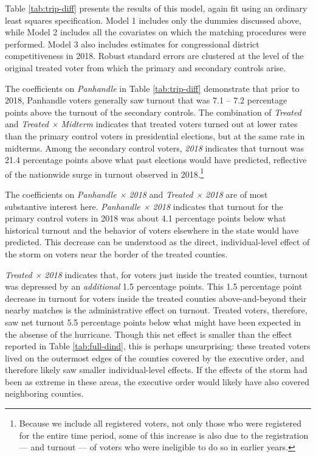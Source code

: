 \documentclass[
  12pt,
]{article}
\begin{document}
Table \ref{tab:trip-diff} presents the results of this model, again fit using an ordinary least squares specification. Model 1 includes only the dummies discussed above, while Model 2 includes all the covariates on which the matching procedures were performed. Model 3 also includes estimates for congressional district competitiveness in 2018. Robust standard errors are clustered at the level of the original treated voter from which the primary and secondary controls arise.

\begin{singlespace}


\end{singlespace}

The coefficients on \emph{Panhandle} in Table \ref{tab:trip-diff} demonstrate that prior to 2018, Panhandle voters generally saw turnout that was 7.1 -- 7.2 percentage points above the turnout of the secondary controls. The combination of \emph{Treated} and \emph{Treated × Midterm} indicates that treated voters turned out at lower rates than the primary control voters in presidential elections, but at the same rate in midterms. Among the secondary control voters, \emph{2018} indicates that turnout was 21.4 percentage points above what past elections would have predicted, reflective of the nationwide surge in turnout observed in 2018.\footnote{Because we include all registered voters, not only those who were registered for the entire time period, some of this increase is also due to the registration --- and turnout --- of voters who were ineligible to do so in earlier years.}

The coefficients on \emph{Panhandle × 2018} and \emph{Treated × 2018} are of most substantive interest here. \emph{Panhandle × 2018} indicates that turnout for the primary control voters in 2018 was about 4.1 percentage points below what historical turnout and the behavior of voters elsewhere in the state would have predicted. This decrease can be understood as the direct, individual-level effect of the storm on voters near the border of the treated counties.

\emph{Treated × 2018} indicates that, for voters just inside the treated counties, turnout was depressed by an \emph{additional} 1.5 percentage points. This 1.5 percentage point decrease in turnout for voters inside the treated counties above-and-beyond their nearby matches is the administrative effect on turnout. Treated voters, therefore, saw net turnout 5.5 percentage points below what might have been expected in the absense of the hurricane. Though this net effect is smaller than the effect reported in Table \ref{tab:full-dind}, this is perhaps unsurprising: these treated voters lived on the outermost edges of the counties covered by the executive order, and therefore likely saw smaller individual-level effects. If the effects of the storm had been as extreme in these areas, the executive order would likely have also covered neighboring counties.
\end{document}
